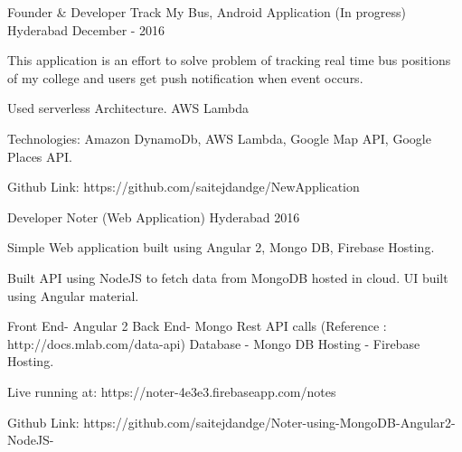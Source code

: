 \begin{cventries}
  \cventry
    {Founder \& Developer} %
    {Track My Bus, Android Application (In progress)} %
    {Hyderabad} %
    {December - 2016} %
    {
      \begin{cvitems} %
        \item {This application is an effort to solve problem of tracking real time bus positions of my college and users get push notification when event occurs.}
        \item {Used serverless Architecture. AWS Lambda}
        \item{
        Technologies: Amazon DynamoDb, AWS Lambda, Google Map API, Google Places API.}\item{
        Github Link: https://github.com/saitejdandge/NewApplication
        }
      \end{cvitems}
    }


  \cventry
    {Developer} %
    {Noter (Web Application)} %
    {Hyderabad} %
    {2016} %
    {
      \begin{cvitems} %
        \item {Simple Web application built using Angular 2, Mongo DB, Firebase Hosting.}
        \item {Built API using NodeJS to fetch data from MongoDB hosted in cloud. UI built using Angular material.}
        \item{
        Front End- Angular 2\newline
Back End- Mongo Rest API calls (Reference : http://docs.mlab.com/data-api)\newline
Database - Mongo DB\newline
Hosting - Firebase Hosting.
        }
        \item{
        Live running at: https://noter-4e3e3.firebaseapp.com/notes}\item{
        Github Link: https://github.com/saitejdandge/Noter-using-MongoDB-Angular2-NodeJS-}
      \end{cvitems}
    }


\end{cventries}
